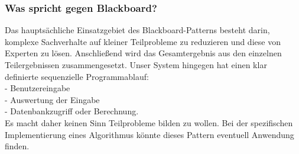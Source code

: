 \subsubsection{Was spricht gegen Blackboard?}
Das hauptsächliche Einsatzgebiet des Blackboard-Patterns besteht darin, komplexe Sachverhalte auf kleiner Teilprobleme zu reduzieren und diese von Experten zu lösen. Anschließend wird das Gesamtergebnis aus den einzelnen Teilergebnissen zusammengesetzt. 
Unser System hingegen hat einen klar definierte sequenzielle Programmablauf: \\
- Benutzereingabe\\
- Auswertung der Eingabe\\
- Datenbankzugriff oder Berechnung.\\
Es macht daher keinen Sinn Teilprobleme bilden zu wollen. Bei der spezifischen Implementierung eines Algorithmus könnte dieses Pattern eventuell Anwendung finden.